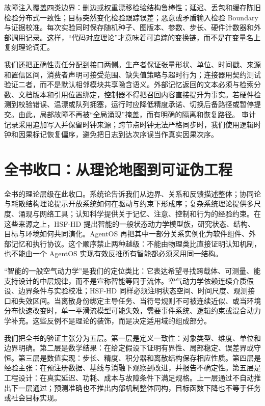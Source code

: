 故障注入覆盖四类边界：删边或权重漂移检验结构鲁棒性；延迟、丢包和缓存陈旧检验分布式一致性；目标突然变化检验跟踪误差；恶意或矛盾输入检验 Boundary 与证据校准。每次实验同时保存随机种子、图版本、参数、步长、硬件计数器和外部调用记录。这样，“代码对应理论”才意味着可追踪的变换链，而不是在变量名上复刻理论词汇。

我们还把正确性责任分配到接口两侧。生产者保证张量形状、单位、时间戳、来源和置信区间，消费者声明可接受范围、缺失值策略与超时行为；连接器用契约测试验证二者，而不是默认相邻模块共享隐含语义。外部记忆返回的文本必须与检索分数、文档版本和引用位置绑定，控制器不得把召回内容直接提升为事实。若硬件检测到校验错误、温漂或队列拥塞，运行时应降低精度承诺、切换后备路径或暂停提交。由此，局部故障不再被“全局涌现”掩盖，而有明确的隔离和恢复路径。
审计记录采用追加写入并保留时钟来源；跨节点时钟无法严格同步时，我们使用逻辑时钟和因果标记恢复偏序，避免把日志到达次序误当作真实因果次序。

\section{全书收口：从理论地图到可证伪工程}

全书的理论层级在此收口。系统论告诉我们从边界、关系和反馈描述整体；协同论与耗散结构理论提示开放系统如何在驱动与约束下形成序；复杂系统理论提供多尺度、涌现与网络工具；认知科学提供关于记忆、注意、控制和行为的经验约束。在这些来源之上，HSF-HD 提出智能的一般状态动力学模型族，研究状态、结构、目标与环境如何共同演化。AgentOS 再把其中一部分关系实例化为软件组件、外部记忆和执行协议。这个顺序禁止两种越级：不能由物理类比直接证明认知机制，也不能由一个 AgentOS 实现有效反推所有智能都必须采用同一结构。

“智能的一般空气动力学”是我们的定位类比：它表达希望寻找跨载体、可测量、能支持设计的中层规律，而不是宣称智能等同于流体。空气动力学依赖连续介质假设、边界条件与实验校准；HSF-HD 同样必须注明状态空间、时间尺度、观测接口和失效区间。当离散身份绑定主导任务、当符号规则不可被连续近似、或当环境分布快速改变时，单一平滑流模型可能失效，需要事件系统、逻辑约束或混合动力学补充。这些反例不是理论的装饰，而是决定适用域的组成部分。

我们把全书的验证主张分为五层。第一层是定义一致性：对象类型、维度、单位和边界明确。第二层是数学结果：在给定假设下证明有界性、局部稳定、误差界或守恒。第三层是数值实现：步长、精度、积分器和离散结构保存相应性质。第四层是经验主张：在预注册数据、基线与消融下观察到改进，并报告不确定性。第五层是工程设计：在真实延迟、功耗、成本与故障条件下满足规格。上一层通过不自动推出下一层通过；预测准确也不推出内部机制整体同构，目标函数下降也不等于任务或社会目标实现。

